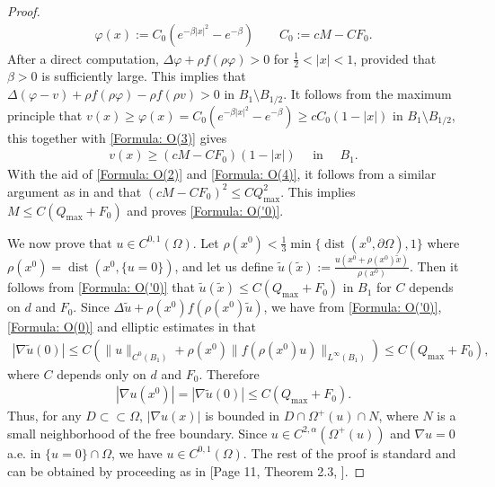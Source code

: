 \documentclass[11pt,reqno]{amsart}
\begin{document}
\begin{proof}
    \begin{align*}
    	\varphi(x):=C_{0}(e^{-\beta|x|^{2}}-e^{-\beta})\qquad C_{0}:=cM-CF_{0}.
    \end{align*}
    After a direct computation, $\Delta\varphi+\rho f(\rho\varphi)>0$ for $\frac{1}{2}<|x|<1$, provided that $\beta>0$ is sufficiently large. This implies that $\Delta(\varphi-v)+\rho f(\rho\varphi)-\rho f(\rho v)>0$ in $B_{1}\setminus B_{1/2}$. It follows from the maximum principle that $v(x)\geqslant\varphi(x)=C_{0}(e^{-\beta|x|^{2}}-e^{-\beta})\geqslant cC_{0}(1-|x|)$ in $B_{1}\setminus B_{1/2}$, this together with \eqref{Formula: O(3)} gives
    \begin{align}\label{Formula: O(4)}
    	v(x)\geqslant(cM-CF_{0})(1-|x|)\quad\text{ in }\quad B_{1}.
    \end{align}
    With the aid of \eqref{Formula: O(2)} and \eqref{Formula: O(4)}, it follows from a similar argument as in \cite[Lemma 3.2]{AC1981} and \cite[Lemma 2.2]{ACF1984} that $(cM-CF_{0})^{2}\leqslant CQ_{\mathrm{max}}^{2}$. This implies $M\leqslant C(Q_{\mathrm{max}}+F_{0})$ and proves \eqref{Formula: O('0)}.
    
    We now prove that $u\in C^{0,1}(\Omega)$. Let $\rho(x^{0})<\tfrac{1}{3}\min\{\operatorname{dist}(x^{0},\partial\Omega),1\}$ where $\rho(x^{0})=\operatorname{dist}(x^{0},\{u=0\})$, and let us define $\tilde{u}(\tilde{x}):=\frac{u(x^{0}+\rho(x^{0})\tilde{x})}{\rho(x^{0})}$. Then it follows from \eqref{Formula: O('0)} that $\tilde{u}(\tilde{x})\leqslant C(Q_{\mathrm{max}}+F_{0})$ in $B_{1}$ for $C$ depends on $d$ and $F_{0}$. Since $\Delta\tilde{u}+\rho(x^{0})f(\rho(x^{0})\tilde{u})$, we have from \eqref{Formula: O('0)},  \eqref{Formula: O(0)} and elliptic estimates in \cite{GT1998} that
    \begin{align*}
    	|\nabla\tilde{u}(0)|\leqslant C(\|u\|_{C^{0}(B_{1})}+\rho(x^{0})\|f(\rho(x^{0})u)\|_{L^{\infty}(B_{1})})\leqslant C(Q_{\mathrm{max}}+F_{0}),
    \end{align*}
    where $C$ depends only on $d$ and $F_{0}$. Therefore
    \begin{align*}
    	|\nabla u(x^{0})|=|\nabla\tilde{u}(0)|\leqslant C(Q_{\mathrm{max}}+F_{0}).
    \end{align*}
    Thus, for any $D\subset\subset\Omega$, $|\nabla u(x)|$ is bounded in $D\cap\varOmega^{+}(u)\cap N$, where $N$ is a small neighborhood of the free boundary. Since $u\in C^{2,\alpha}(\varOmega^{+}(u))$ and $\nabla u=0$ a.e. in  $\{u=0\}\cap\Omega$, we have $u\in C^{0,1}(\Omega)$. The rest of the proof is standard and can be obtained by proceeding as in [Page 11, Theorem 2.3, \cite{ACF1984}].
\end{proof}
\end{document}
